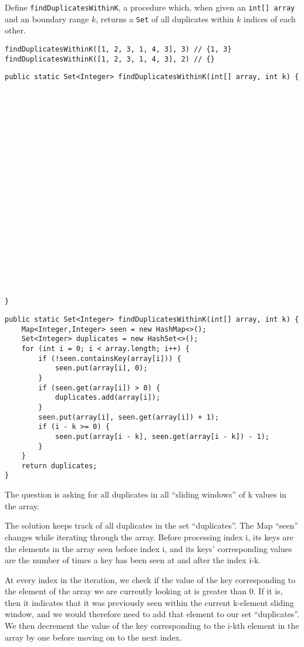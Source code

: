 \begin{blocksection}
\question Define \lstinline$findDuplicatesWithinK$, a procedure which, when
given an \lstinline$int[] array$ and an boundary range $k$, returns a
\lstinline$Set$ of all  duplicates within $k$ indices of each other.

\begin{lstlisting}
findDuplicatesWithinK([1, 2, 3, 1, 4, 3], 3) // {1, 3}
findDuplicatesWithinK([1, 2, 3, 1, 4, 3], 2) // {}
\end{lstlisting}

\ifprintanswers\else
\begin{lstlisting}
public static Set<Integer> findDuplicatesWithinK(int[] array, int k) {






















}
\end{lstlisting}
\fi

\begin{solution}
\begin{lstlisting}
public static Set<Integer> findDuplicatesWithinK(int[] array, int k) {
    Map<Integer,Integer> seen = new HashMap<>();
    Set<Integer> duplicates = new HashSet<>();
    for (int i = 0; i < array.length; i++) {
        if (!seen.containsKey(array[i])) {
            seen.put(array[i], 0);
        }
        if (seen.get(array[i]) > 0) {
            duplicates.add(array[i]);
        }
        seen.put(array[i], seen.get(array[i]) + 1);
        if (i - k >= 0) {
            seen.put(array[i - k], seen.get(array[i - k]) - 1);
        }
    }
    return duplicates;
}
\end{lstlisting}

The question is asking for all duplicates in all ``sliding windows'' of k values in the array.

The solution keeps track of all duplicates in the set ``duplicates''. 
The Map ``seen'' changes while iterating through the array. Before processing index i, its keys are the elements in the array seen before index i, and its keys' corresponding values are the number of times a key has been seen at and after the index i-k.

At every index in the iteration, we check if the value of the key corresponding to the element of the array we are currently looking at is greater than 0. If it is, then it indicates that it was previously seen within the current k-element sliding window, and we would therefore need to add that element to our set ``duplicates''. We then decrement the value of the key corresponding to the i-kth element in the array by one before moving on to the next index.
\end{solution}
\end{blocksection}
